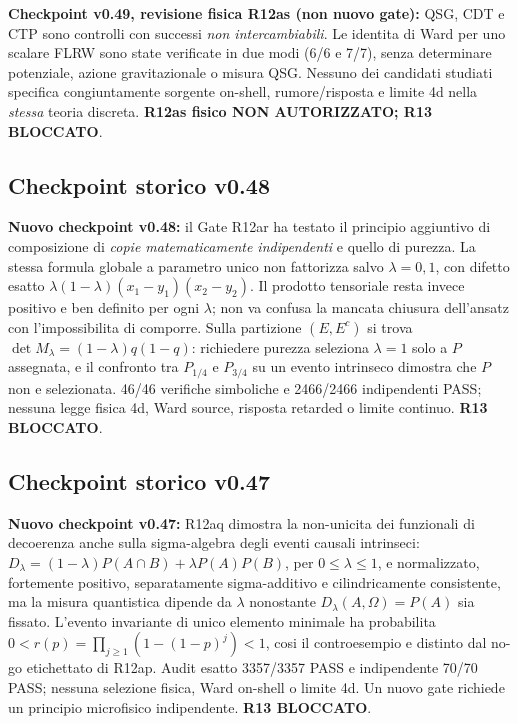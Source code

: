 \documentclass[11pt,a4paper]{article}
\begin{document}
\textbf{Checkpoint v0.49, revisione fisica R12as (non nuovo gate):} QSG, CDT e CTP sono controlli con successi \emph{non intercambiabili}. Le identita di Ward per uno scalare FLRW sono state verificate in due modi (6/6 e 7/7), senza determinare potenziale, azione gravitazionale o misura QSG. Nessuno dei candidati studiati specifica congiuntamente sorgente on-shell, rumore/risposta e limite 4d nella \emph{stessa} teoria discreta. \textbf{R12as fisico NON AUTORIZZATO; R13 BLOCCATO}. \par\medskip

\subsection*{Checkpoint storico v0.48}

\textbf{Nuovo checkpoint v0.48:} il Gate R12ar ha testato il principio aggiuntivo di composizione di \emph{copie matematicamente indipendenti} e quello di purezza. La stessa formula globale a parametro unico non fattorizza salvo $\lambda=0,1$, con difetto esatto $\lambda(1-\lambda)(x_1-y_1)(x_2-y_2)$. Il prodotto tensoriale resta invece positivo e ben definito per ogni $\lambda$; non va confusa la mancata chiusura dell'ansatz con l'impossibilita di comporre. Sulla partizione $(E,E^c)$ si trova $\det M_\lambda=(1-\lambda)q(1-q)$: richiedere purezza seleziona $\lambda=1$ solo a $P$ assegnata, e il confronto tra $P_{1/4}$ e $P_{3/4}$ su un evento intrinseco dimostra che $P$ non e selezionata. 46/46 verifiche simboliche e 2466/2466 indipendenti PASS; nessuna legge fisica 4d, Ward source, risposta retarded o limite continuo. \textbf{R13 BLOCCATO}.\par\medskip

\subsection*{Checkpoint storico v0.47}

\textbf{Nuovo checkpoint v0.47:} R12aq dimostra la non-unicita dei funzionali di decoerenza anche sulla sigma-algebra degli eventi causali intrinseci: $D_\lambda=(1-\lambda)P(A\cap B)+\lambda P(A)P(B)$, per $0\le\lambda\le1$, e normalizzato, fortemente positivo, separatamente sigma-additivo e cilindricamente consistente, ma la misura quantistica dipende da $\lambda$ nonostante $D_\lambda(A,\Omega)=P(A)$ sia fissato. L'evento invariante di unico elemento minimale ha probabilita $0<r(p)=\prod_{j\ge1}(1-(1-p)^j)<1$, cosi il controesempio e distinto dal no-go etichettato di R12ap. Audit esatto 3357/3357 PASS e indipendente 70/70 PASS; nessuna selezione fisica, Ward on-shell o limite 4d. Un nuovo gate richiede un principio microfisico indipendente. \textbf{R13 BLOCCATO}.\par\medskip
\end{document}
